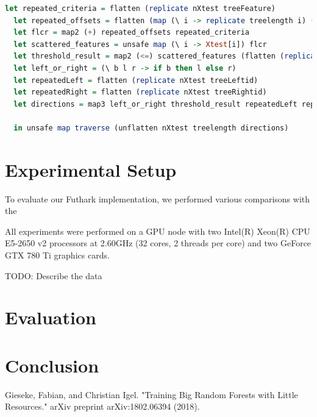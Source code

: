 \documentclass[a4paper]{article}
\begin{document}
\vspace{1ex}
\begin{lrbox}{\lstboxfive}
\begin{minipage}{\textwidth}
\begin{lstlisting}[language=Haskell, breaklines]
let repeated_criteria = flatten (replicate nXtest treeFeature)
  let repeated_offsets = flatten (map (\ i -> replicate treelength i) (steps 0 nXtest dXtest))
  let flcr = map2 (+) repeated_offsets repeated_criteria
  let scattered_features = unsafe map (\ i -> Xtest[i]) flcr
  let threshold_result = map2 (<=) scattered_features (flatten (replicate nXtest treeThres_or_leaf))
  let left_or_right = (\ b l r -> if b then l else r)
  let repeatedLeft = flatten (replicate nXtest treeLeftid)
  let repeatedRight = flatten (replicate nXtest treeRightid)
  let directions = map3 left_or_right threshold_result repeatedLeft repeatedRight

  in unsafe map traverse (unflatten nXtest treelength directions)
\end{lstlisting}
\end{minipage}
\end{lrbox}
\vspace{1ex}

\colorbox{lightgray}{\usebox\lstboxfive}


\section{Experimental Setup}

To evaluate our Futhark implementation, we performed various comparisons with the 

All experiments were performed on a GPU node with two Intel(R) Xeon(R) CPU E5-2650 v2 processors at 2.60GHz (32 cores, 2 threads per core) and two GeForce GTX 780 Ti graphics cards.

TODO: Describe the data

\section{Evaluation}

\section{Conclusion}

\begin{thebibliography}{}

Gieseke, Fabian, and Christian Igel. "Training Big Random Forests with Little Resources." arXiv preprint arXiv:1802.06394 (2018).

\end{thebibliography}
\end{document}
